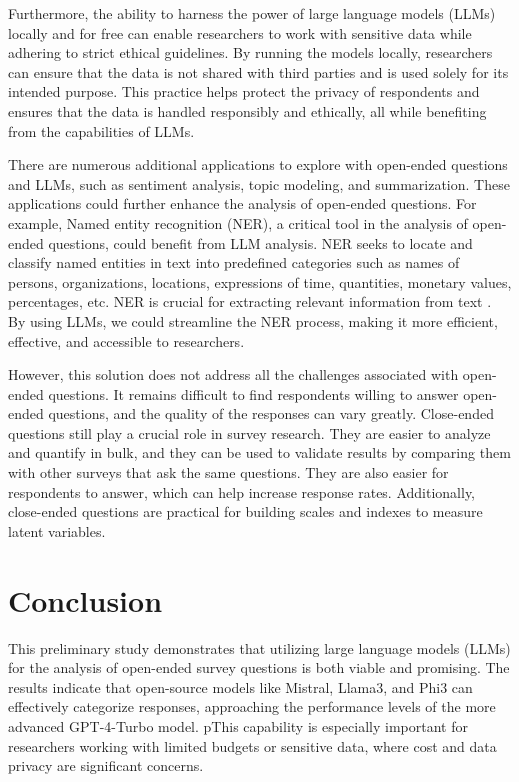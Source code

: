 \documentclass[
  authoryear,
  preprint,
  3p]{elsarticle}
\begin{document}
Furthermore, the ability to harness the power of large language models
(LLMs) locally and for free can enable researchers to work with
sensitive data while adhering to strict ethical guidelines. By running
the models locally, researchers can ensure that the data is not shared
with third parties and is used solely for its intended purpose. This
practice helps protect the privacy of respondents and ensures that the
data is handled responsibly and ethically, all while benefiting from the
capabilities of LLMs.

There are numerous additional applications to explore with open-ended
questions and LLMs, such as sentiment analysis, topic modeling, and
summarization. These applications could further enhance the analysis of
open-ended questions. For example, Named entity recognition (NER), a
critical tool in the analysis of open-ended questions, could benefit
from LLM analysis. NER seeks to locate and classify named entities in
text into predefined categories such as names of persons, organizations,
locations, expressions of time, quantities, monetary values,
percentages, etc. NER is crucial for extracting relevant information
from text \citep{yadav_bethard19}. By using LLMs, we could streamline
the NER process, making it more efficient, effective, and accessible to
researchers.

However, this solution does not address all the challenges associated
with open-ended questions. It remains difficult to find respondents
willing to answer open-ended questions, and the quality of the responses
can vary greatly. Close-ended questions still play a crucial role in
survey research. They are easier to analyze and quantify in bulk, and
they can be used to validate results by comparing them with other
surveys that ask the same questions. They are also easier for
respondents to answer, which can help increase response rates.
Additionally, close-ended questions are practical for building scales
and indexes to measure latent variables.

\section{Conclusion}\label{conclusion}

This preliminary study demonstrates that utilizing large language models
(LLMs) for the analysis of open-ended survey questions is both viable
and promising. The results indicate that open-source models like
Mistral, Llama3, and Phi3 can effectively categorize responses,
approaching the performance levels of the more advanced GPT-4-Turbo
model. pThis capability is especially important for researchers working
with limited budgets or sensitive data, where cost and data privacy are
significant concerns.
\end{document}
